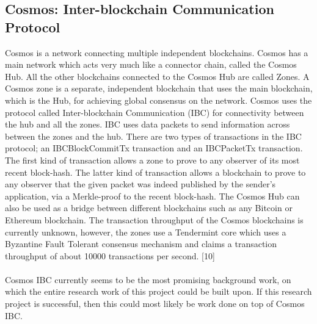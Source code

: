 \documentclass[a4paper,twoside,phd]{BYUPhys}
\begin{document}
\subsection{Cosmos: Inter-blockchain Communication Protocol}
Cosmos is a network connecting multiple independent blockchains. Cosmos has a main network which acts very much like a connector chain, called the Cosmos Hub. All the other blockchains connected to the Cosmos Hub are called Zones. A Cosmos zone is a separate, independent blockchain that uses the main blockchain, which is the Hub, for achieving global consensus on the network. Cosmos uses the protocol called Inter-blockchain Communication (IBC) for connectivity between the hub and all the zones. IBC uses data packets to send information across between the zones and the hub. There are two types of transactions in the IBC protocol; an IBCBlockCommitTx transaction and an IBCPacketTx transaction. The first kind of transaction allows a zone to prove to any observer of its most recent block-hash. The latter kind of transaction allows a blockchain to prove to any observer that the given packet was indeed published by the sender's application, via a Merkle-proof to the recent block-hash. The Cosmos Hub can also be used as a bridge between different blockchains such as any Bitcoin or Ethereum blockchain. The transaction throughput of the Cosmos blockchains is currently unknown, however, the zones use a Tendermint core which uses a Byzantine Fault Tolerant consensus mechanism and claims a transaction throughput of about 10000 transactions per second. [10]
\\
\\
Cosmos IBC currently seems to be the most promising background work, on which the entire research work of this project could be built upon. If this research project is successful, then this could most likely be work done on top of Cosmos IBC.
\end{document}
